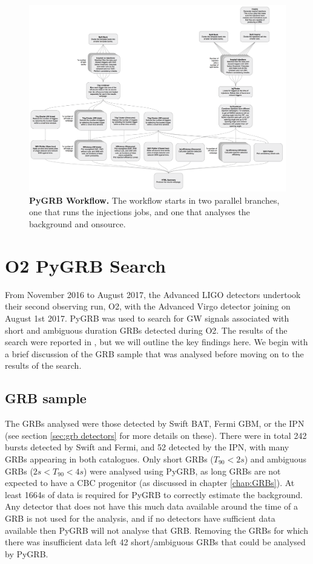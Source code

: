 \documentclass[11pt]{cuthesis}
\begin{document}
\begin{figure} %
\begin{center}
\includegraphics[width=1.0\linewidth]{pygrb_flowchart.png}
\end{center}
\caption{\textbf{PyGRB Workflow.} The workflow starts in two parallel branches, one that runs the injections jobs, and one that analyses the background and onsource. }
\label{fig:pygrb flowchart}
\end{figure}

\section{O2 PyGRB Search} \label{sec:pygrb o2 results}
From November 2016 to August 2017, the Advanced LIGO detectors undertook their second observing run, O2, with the Advanced Virgo detector joining on August 1st 2017. PyGRB was used to search for GW signals associated with short and ambiguous duration GRBs detected during O2. The results of the search were reported in \cite{o2grb}, but we will outline the key findings here. We begin with a brief discussion of the GRB sample that was analysed before moving on to the results of the search.

\subsection{GRB sample}
The GRBs analysed were those detected by Swift BAT, Fermi GBM, or the IPN (see section \ref{sec:grb detectors} for more details on these). There were in total 242 bursts detected by Swift and Fermi, and 52 detected by the IPN, with many GRBs appearing in both catalogues. Only short GRBs ($T_{90}<2s$) and ambiguous GRBs ($2s<T_{90}<4s$) were analysed using PyGRB, as long GRBs are not expected to have a CBC progenitor (as discussed in chapter \ref{chap:GRBs}). At least 1664s of data is required for PyGRB to correctly estimate the background. Any detector that does not have this much data available around the time of a GRB is not used for the analysis, and if no detectors have sufficient data available then PyGRB will not analyse that GRB. Removing the GRBs for which there was insufficient data left 42 short/ambiguous GRBs that could be analysed by PyGRB.
\end{document}
